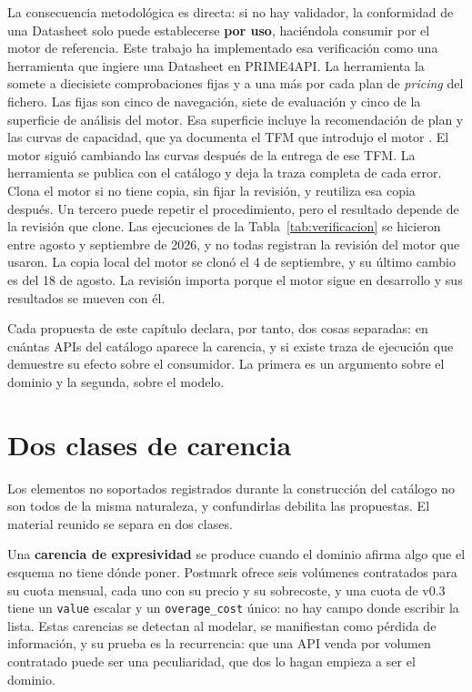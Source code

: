 La consecuencia metodológica es directa: si no hay validador, la conformidad de una Datasheet solo puede establecerse \textbf{por uso}, haciéndola consumir por el motor de referencia.
Este trabajo ha implementado esa verificación como una herramienta que ingiere una Datasheet en PRIME4API.
La herramienta la somete a diecisiete comprobaciones fijas y a una más por cada plan de \textit{pricing} del fichero.
Las fijas son cinco de navegación, siete de evaluación y cinco de la superficie de análisis del motor.
Esa superficie incluye la recomendación de plan y las curvas de capacidad, que ya documenta el TFM que introdujo el motor \citep{gavira2026tfm}.
El motor siguió cambiando las curvas después de la entrega de ese TFM.
La herramienta se publica con el catálogo y deja la traza completa de cada error.
Clona el motor si no tiene copia, sin fijar la revisión, y reutiliza esa copia después.
Un tercero puede repetir el procedimiento, pero el resultado depende de la revisión que clone.
Las ejecuciones de la Tabla~\ref{tab:verificacion} se hicieron entre agosto y septiembre de 2026, y no todas registran la revisión del motor que usaron.
La copia local del motor se clonó el 4 de septiembre, y su último cambio es del 18 de agosto.
La revisión importa porque el motor sigue en desarrollo y sus resultados se mueven con él.

Cada propuesta de este capítulo declara, por tanto, dos cosas separadas: en
cuántas APIs del catálogo aparece la carencia, y si existe traza de ejecución que
demuestre su efecto sobre el consumidor. La primera es un argumento sobre el
dominio y la segunda, sobre el modelo.

\section{Dos clases de carencia}
\label{sec:evolucion:clases}

Los elementos no soportados registrados durante la construcción del catálogo no son todos de
la misma naturaleza, y confundirlas debilita las propuestas. El material reunido
se separa en dos clases.

Una \textbf{carencia de expresividad} se produce cuando el dominio afirma algo que
el esquema no tiene dónde poner. Postmark ofrece seis volúmenes contratados para
su cuota mensual, cada uno con su precio y su sobrecoste, y una cuota de v0.3
tiene un \texttt{value} escalar y un \texttt{overage\_cost} único: no hay campo
donde escribir la lista. Estas carencias se detectan al modelar, se manifiestan
como pérdida de información, y su prueba es la recurrencia: que una API venda por
volumen contratado puede ser una peculiaridad, que dos lo hagan empieza a ser el
dominio.


